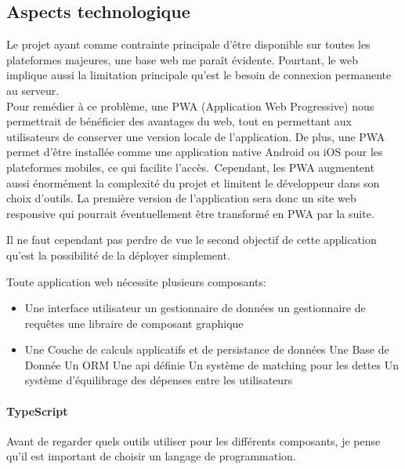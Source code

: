 
\subsection{Aspects technologique}\label{subsec:aspects-technologique}
Le projet ayant comme contrainte principale d'être disponible sur toutes les plateformes majeures, une base web me paraît évidente.
Pourtant, le web implique aussi la limitation principale qu'est le besoin de connexion permanente au serveur.\\

Pour remédier à ce problème, une PWA (Application Web Progressive) nous permettrait de bénéficier des avantages du web,
tout en permettant aux utilisateurs de conserver une version locale de l'application.
De plus, une PWA permet d'être installée comme une application native Android ou iOS pour les plateformes mobiles, ce qui facilite l'accès.\
Cependant, les PWA augmentent aussi énormément la complexité du projet et limitent le développeur dans son choix d'outils.
La première version de l'application sera donc un site web responsive qui pourrait éventuellement être transformé en PWA par la suite.

Il ne faut cependant pas perdre de vue le second objectif de cette application qu'est la possibilité de la déployer simplement.

Toute application web nécessite plusieurs composants:
\begin{itemize}
    \item Une interface utilisateur
    \subitem un gestionnaire de données
    \subitem un gestionnaire de requêtes
    \subitem une libraire de composant graphique
    \item Une Couche de calculs applicatifs et de persistance de données
    \subitem Une Base de Donnée
    \subitem Un ORM
    \subitem Une \Gls{api} définie
    \subitem Un système de matching pour les dettes
    \subitem Un système d'équilibrage des dépenses entre les utilisateurs
\end{itemize}

\paragraph{TypeScript}
Avant de regarder quels outils utiliser pour les différents composants, je pense qu'il est important de choisir un langage de programmation.\\

